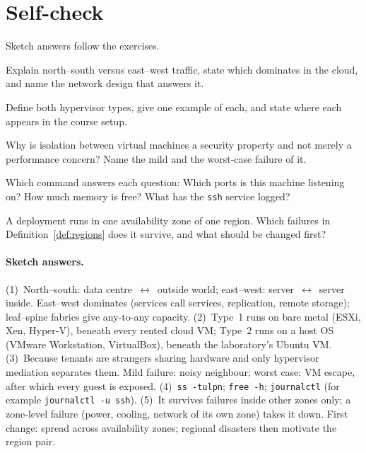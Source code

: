 \section*{Self-check}

Sketch answers follow the exercises.

\begin{exercise}
Explain north--south versus east--west traffic, state which dominates in the
cloud, and name the network design that answers it.
\end{exercise}

\begin{exercise}
Define both hypervisor types, give one example of each, and state where each
appears in the course setup.
\end{exercise}

\begin{exercise}
Why is isolation between virtual machines a security property and not merely a
performance concern? Name the mild and the worst-case failure of it.
\end{exercise}

\begin{exercise}
Which command answers each question: Which ports is this machine listening on?
How much memory is free? What has the \texttt{ssh} service logged?
\end{exercise}

\begin{exercise}
A deployment runs in one availability zone of one region. Which failures in
Definition~\ref{def:regions} does it survive, and what should be changed
first?
\end{exercise}

\paragraph{Sketch answers.}
{\small
(1)~North--south: data centre~$\leftrightarrow$~outside world; east--west:
server~$\leftrightarrow$~server inside. East--west dominates (services call
services, replication, remote storage); leaf--spine fabrics give any-to-any
capacity. (2)~Type~1 runs on bare metal (ESXi, Xen, Hyper-V), beneath every
rented cloud VM; Type~2 runs on a host OS (VMware Workstation, VirtualBox),
beneath the laboratory's Ubuntu VM. (3)~Because tenants are strangers sharing
hardware and only hypervisor mediation separates them. Mild failure: noisy
neighbour; worst case: VM escape, after which every guest is exposed.
(4)~\texttt{ss -tulpn}; \texttt{free -h}; \texttt{journalctl} (for example
\texttt{journalctl -u ssh}). (5)~It survives failures inside other zones
only; a zone-level failure (power, cooling, network of its own zone) takes it
down. First change: spread across availability zones; regional disasters then
motivate the region pair.}


